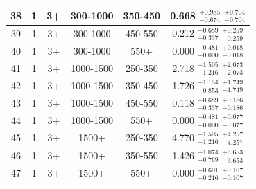 \begin{table}[htbp]
\begin{centering}
\begin{tabular}{|c|c|c|c|c||c|}
 \hline
             38 &               1 &              3+ &        300-1000 &         350-450 & 0.668 $^{+0.985}_{-0.674}$  $^{+0.704}_{-0.704}$  \\
 \hline
             39 &               1 &              3+ &        300-1000 &         450-550 & 0.212 $^{+0.689}_{-0.337}$  $^{+0.259}_{-0.259}$  \\
 \hline
             40 &               1 &              3+ &        300-1000 &            550+ & 0.000 $^{+0.481}_{-0.000}$  $^{+0.018}_{-0.018}$  \\
 \hline
             41 &               1 &              3+ &       1000-1500 &         250-350 & 2.718 $^{+1.505}_{-1.216}$  $^{+2.073}_{-2.073}$  \\
 \hline
             42 &               1 &              3+ &       1000-1500 &         350-450 & 1.726 $^{+1.154}_{-0.853}$  $^{+1.749}_{-1.749}$  \\
 \hline
             43 &               1 &              3+ &       1000-1500 &         450-550 & 0.118 $^{+0.689}_{-0.337}$  $^{+0.186}_{-0.186}$  \\
 \hline
             44 &               1 &              3+ &       1000-1500 &            550+ & 0.000 $^{+0.481}_{-0.000}$  $^{+0.077}_{-0.077}$  \\
 \hline
             45 &               1 &              3+ &           1500+ &         250-350 & 4.770 $^{+1.505}_{-1.216}$  $^{+4.257}_{-4.257}$  \\
 \hline
             46 &               1 &              3+ &           1500+ &         350-550 & 1.426 $^{+1.074}_{-0.769}$  $^{+3.653}_{-3.653}$  \\
 \hline
             47 &               1 &              3+ &           1500+ &            550+ & 0.000 $^{+0.601}_{-0.216}$  $^{+0.107}_{-0.107}$  \\
 \hline
\end{tabular}
\par\end{centering}
\end{table}

